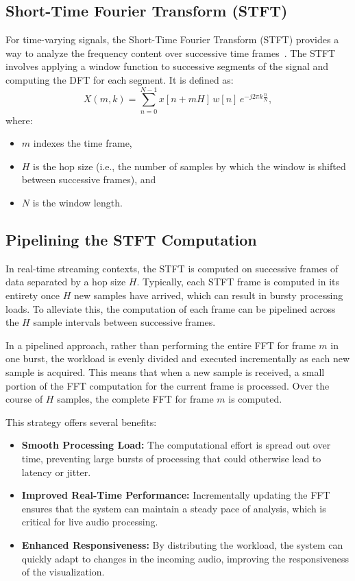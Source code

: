 \documentclass[12pt,letter]{article}
\begin{document}
\subsection{Short-Time Fourier Transform (STFT)}

For time-varying signals, the Short-Time Fourier Transform (STFT) provides a
way to analyze the frequency content over successive time
frames~\citep{allen1977short}. The STFT involves applying a window function
to successive segments of the signal and computing the DFT for each segment.
It is defined as:
\begin{equation}
X(m, k) = \sum_{n=0}^{N-1} x[n + mH] \, w[n] \, e^{-j2\pi k \frac{n}{N}},
\label{eqn:stft}
\end{equation}
where:
\begin{itemize}
  \item $m$ indexes the time frame,
  \item $H$ is the hop size (i.e., the number of samples by which the window
  is shifted between successive frames), and
  \item $N$ is the window length.
\end{itemize}

\subsection{Pipelining the STFT Computation}

In real-time streaming contexts, the STFT is computed on successive frames of
data separated by a hop size $H$. Typically, each STFT frame is computed
in its entirety once $H$ new samples have arrived, which can result in
bursty processing loads. To alleviate this, the computation of each frame can
be pipelined across the $H$ sample intervals between successive frames.

In a pipelined approach, rather than performing the entire FFT for frame
$m$ in one burst, the workload is evenly divided and executed
incrementally as each new sample is acquired. This means that when a new
sample is received, a small portion of the FFT computation for the current
frame is processed. Over the course of $H$ samples, the complete FFT for
frame $m$ is computed.

This strategy offers several benefits:
\begin{itemize}
  \item \textbf{Smooth Processing Load:} The computational effort is spread
  out over time, preventing large bursts of processing that could otherwise
  lead to latency or jitter.
  \item \textbf{Improved Real-Time Performance:} Incrementally updating the
  FFT ensures that the system can maintain a steady pace of analysis, which
  is critical for live audio processing.
  \item \textbf{Enhanced Responsiveness:} By distributing the workload, the
  system can quickly adapt to changes in the incoming audio, improving the
  responsiveness of the visualization.
\end{itemize}
\end{document}
